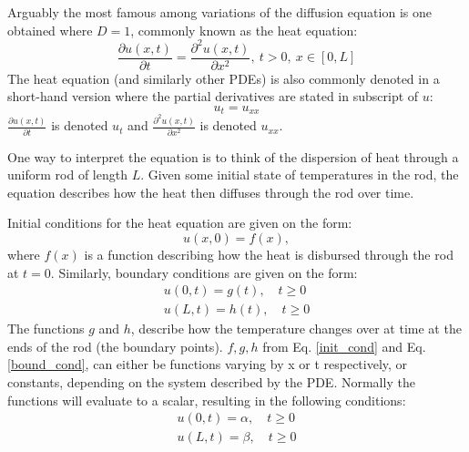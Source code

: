 Arguably the most famous among variations of the diffusion equation is one obtained where $D=1$, commonly known as the heat equation:
\begin{equation}\label{eq:diffu}
    \frac{\partial u(x,t)}{\partial t}=\frac{\partial^2 u(x,t)}{\partial x^2} , \ t>0, \ x\in [0, L]
\end{equation}
The heat equation (and similarly other PDEs) is also commonly denoted in a short-hand version where the partial derivatives are stated in subscript of $u$:  
\begin{equation}\label{u_tu_xx}
    u_t = u_{xx}
\end{equation}
$\frac{\partial u(x,t)}{\partial t}$ is denoted $u_t$ and $\frac{\partial^2 u(x,t)}{\partial x^2}$ is denoted $u_{xx}$.

One way to interpret the equation is to think of the dispersion of heat through a uniform rod of length $L$. Given some initial state of temperatures in the rod, the equation describes how the heat then diffuses through the rod over time. 

Initial conditions for the heat equation are given on the form: 
\begin{equation}\label{init_cond}
    u(x,0) = f(x),
\end{equation}
where $f(x)$ is a function describing how the heat is disbursed through the rod at $t=0$.
Similarly, boundary conditions are given on the form: 
\begin{equation}\label{bound_cond}
    \begin{split}
        u(0, t) = g(t), \quad t \ge 0 \\
        u(L, t) = h(t), \quad t \ge 0
    \end{split}
\end{equation}
The functions $g$ and $h$, describe how the temperature changes over at time at the ends of the rod (the boundary points). 
$f, g, h$ from Eq. \ref{init_cond} and Eq. \ref{bound_cond}, can either be functions varying by x or t respectively, or constants, depending on the system described by the PDE. 
Normally the functions will evaluate to a scalar, resulting in the following conditions: 
\begin{equation}
    \begin{split}
        u(0, t) = \alpha, \quad t\geq0 \\
        u(L, t) = \beta, \quad t\geq0
    \end{split}
\end{equation}

